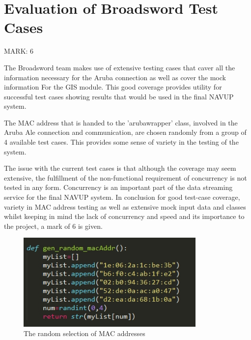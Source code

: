 \documentclass{article}
\begin{document}
\section{Evaluation of Broadsword Test Cases}
\begin{flushleft}
MARK: 6
\end{flushleft}

\begin{flushleft}
The Broadsword team makes use of extensive testing cases that caver all the information necessary for the Aruba connection as well as cover the mock information For the GIS module. This good coverage provides utility for successful test cases showing results that would be used in the final NAVUP system. 
\end{flushleft}

\begin{flushleft}
The MAC address that is handed to the 'aruba\textunderscore wrapper' class, involved in the Aruba Ale connection and communication, are chosen randomly from a group of 4 available test cases. This provides some sense of variety in the testing of the system. 
\end{flushleft}

\begin{flushleft}
The issue with the current test cases is that although the coverage may seem extensive, the fulfillment of the non-functional requirement of concurrency is not tested in any form. Concurrency is an important part of the data streaming service for the final NAVUP system. In conclusion for good test-case coverage, variety in MAC address testing as well as extensive mock input data and classes whilst keeping in mind the lack of concurrency and speed and its importance to the project, a mark of 6 is given.
\end{flushleft}


\begin{figure}[ht]
  \includegraphics[width=350px]{Images/MAC.jpg}
  \caption{The random selection of MAC addresses}
  \label{The random selection of MAC addresses}  
\end{figure}
\end{document}
